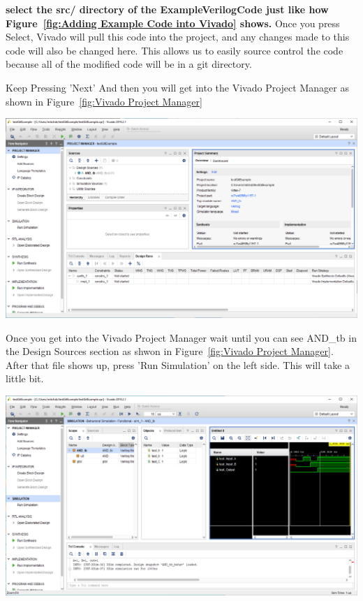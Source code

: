 \documentclass[12pt]{article}
\begin{document}
\textbf{select the src/ directory of the ExampleVerilogCode just like how Figure~\ref{fig:Adding Example Code into Vivado} shows.} Once you press Select, Vivado will pull this code into the project, and any changes made to this code will also be changed here. This allows us to easily source control the code because all of the modified code will be in a git directory.

Keep Pressing 'Next' And then you will get into the Vivado Project Manager as shown in Figure~\ref{fig:Vivado Project Manager}

\begin{center}
    \includegraphics[scale=0.4]{viv_05.PNG}
    \label{fig:Vivado Project Manager}
\end{center}

Once you get into the Vivado Project Manager wait until you can see AND{\_}tb in the Design Sources section as shwon in Figure~\ref{fig:Vivado Project Manager}. After that file shows up, press 'Run Simulation' on the left side. This will take a little bit.

\begin{center}
    \includegraphics[scale=0.4]{viv_06.PNG}
    \label{fig:Running Simulation of Example Project}
\end{center}
\end{document}
